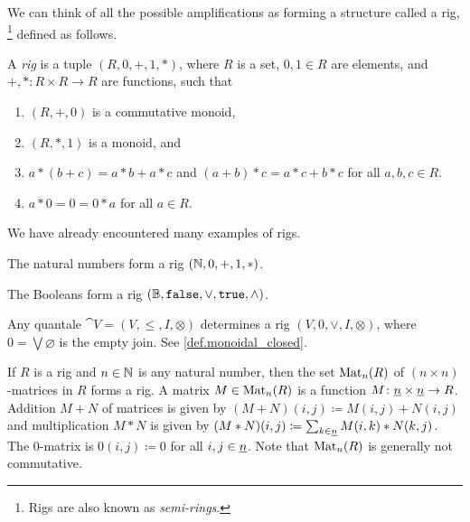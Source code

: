 \documentclass[7Sketches]{subfiles}
\begin{document}
We can think of all the possible amplifications as forming a structure called a rig,%
\footnote{Rigs are also known as \emph{semi-rings}.}
defined as follows.

\begin{definition}%
\label{def.rig}%
A \emph{rig} is a tuple $(R,0,+,1,*)$, where $R$ is a set, $0,1\in R$ are elements, and $+,*\colon R
\times R \to R$ are functions, such that 
\begin{enumerate}[label=(\alph*)]
	\item $(R,+,0)$ is a commutative monoid,
	\item $(R,*,1)$ is a monoid,%
	and	
	\item $a*(b+c)=a* b +a* c$ and $(a+b)*c=a*c+b*c$ for all $a,b,c \in R$.
	\item $a*0=0=0*a$ for all $a\in R$.
\end{enumerate}
\end{definition}

We have already encountered many examples of rigs.
\begin{example}%
\label{ex.rig_nat}%
The natural numbers form a rig $(\mathbb{N},0,+,1,*)$.
\end{example}

\begin{example}%
The Booleans form a rig $(\mathbb{B},\mathtt{false},\vee,\mathtt{true},\wedge)$.
\end{example}

\begin{example}%
\label{ex.quantale_as_rig}%
Any quantale $\cat{V}=(V,\leq,I,\otimes)$ determines a rig $(V,0,\vee,I,\otimes)$, where $0=\bigvee\varnothing$ is the empty join. See \cref{def.monoidal_closed}.
\end{example}

\begin{example}%
\label{ex.mat_rig}%
%
If $R$ is a rig and $n\in\mathbb{N}$ is any natural number, then the set
$\mathrm{Mat}_n(R)$ of $(n\times n)$-matrices in $R$ forms a rig. A matrix
$M\in\mathrm{Mat}_n(R)$ is a function $M\colon \underline{{n}}\times\underline{{n}} \to R$.
Addition $M+N$ of matrices is given by $(M+N)(i,j)\coloneqq M(i,j)+N(i,j)$ and multiplication $M*N$ is given by $(M*N)(i,j)\coloneqq\sum_{k\in\underline{{n}}}M(i,k)*N(k,j)$. The $0$-matrix is $0(i,j)\coloneqq 0$ for all $i,j\in\underline{{n}}$. Note that $\mathrm{Mat}_n(R)$ is generally not commutative.
\end{example}
\end{document}
